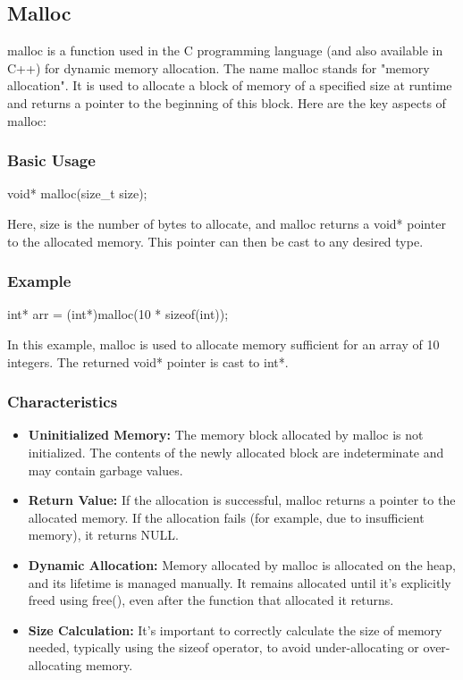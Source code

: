 \documentclass{report}
\begin{document}
    \bigbreak \noindent 
    \subsection{Malloc}
    \bigbreak \noindent 
    \begin{concept}
        malloc is a function used in the C programming language (and also available in C++) for dynamic memory allocation. The name malloc stands for "memory allocation". It is used to allocate a block of memory of a specified size at runtime and returns a pointer to the beginning of this block. Here are the key aspects of malloc:
    \end{concept}
    \bigbreak \noindent 
    \subsubsection{Basic Usage}
    \bigbreak \noindent 
    \begin{cppcode}
    void* malloc(size_t size);
    \end{cppcode}
    \bigbreak \noindent 
    Here, size is the number of bytes to allocate, and malloc returns a void* pointer to the allocated memory. This pointer can then be cast to any desired type.
    \bigbreak \noindent 
    \subsubsection{Example}
    \begin{cppcode}
    int* arr = (int*)malloc(10 * sizeof(int));
    \end{cppcode}
    \bigbreak \noindent 
    In this example, malloc is used to allocate memory sufficient for an array of 10 integers. The returned void* pointer is cast to int*.

    \pagebreak 
    \subsubsection{Characteristics}
    \bigbreak \noindent 
    \begin{itemize}
        \item \textbf{Uninitialized Memory:} The memory block allocated by malloc is not initialized. The contents of the newly allocated block are indeterminate and may contain garbage values.
        \item \textbf{Return Value:} If the allocation is successful, malloc returns a pointer to the allocated memory. If the allocation fails (for example, due to insufficient memory), it returns NULL.
        \item \textbf{Dynamic Allocation:} Memory allocated by malloc is allocated on the heap, and its lifetime is managed manually. It remains allocated until it's explicitly freed using free(), even after the function that allocated it returns.
        \item \textbf{Size Calculation:} It's important to correctly calculate the size of memory needed, typically using the sizeof operator, to avoid under-allocating or over-allocating memory.
    \end{itemize}
    \bigbreak \noindent 
\end{document}
